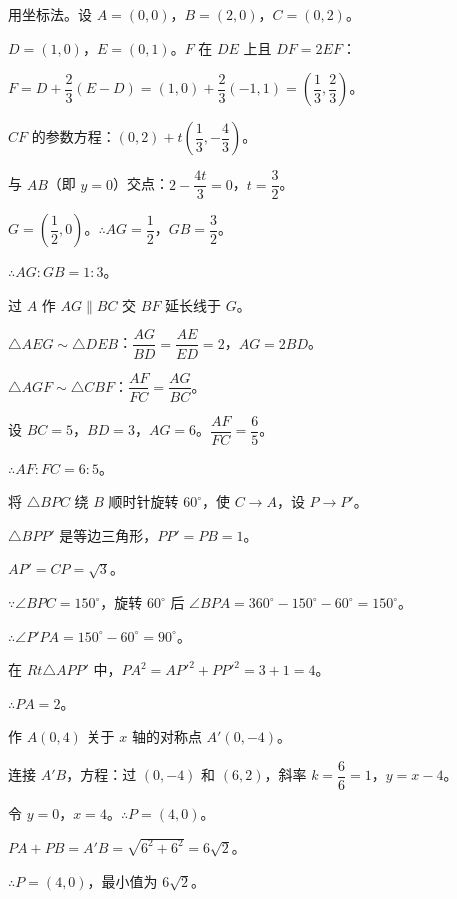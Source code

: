 \documentclass[12pt, a4paper]{ctexart}
\begin{document}
\begin{knowledgebox}[第 4 题 参考答案]
用坐标法。设 \(A = (0, 0)\)，\(B = (2, 0)\)，\(C = (0, 2)\)。

\(D = (1, 0)\)，\(E = (0, 1)\)。\(F\) 在 \(DE\) 上且 \(DF = 2EF\)：

\(F = D + \dfrac{2}{3}(E - D) = (1, 0) + \dfrac{2}{3}(-1, 1) = \left(\dfrac{1}{3}, \dfrac{2}{3}\right)\)。

\(CF\) 的参数方程：\((0, 2) + t\left(\dfrac{1}{3}, -\dfrac{4}{3}\right)\)。

与 \(AB\)（即 \(y = 0\)）交点：\(2 - \dfrac{4t}{3} = 0\)，\(t = \dfrac{3}{2}\)。

\(G = \left(\dfrac{1}{2}, 0\right)\)。\(\therefore AG = \dfrac{1}{2}\)，\(GB = \dfrac{3}{2}\)。

\(\therefore AG:GB = 1:3\)。
\end{knowledgebox}

\begin{knowledgebox}[第 5 题 参考答案]
过 \(A\) 作 \(AG \parallel BC\) 交 \(BF\) 延长线于 \(G\)。

\(\triangle AEG \sim \triangle DEB\)：\(\dfrac{AG}{BD} = \dfrac{AE}{ED} = 2\)，\(AG = 2BD\)。

\(\triangle AGF \sim \triangle CBF\)：\(\dfrac{AF}{FC} = \dfrac{AG}{BC}\)。

设 \(BC = 5\)，\(BD = 3\)，\(AG = 6\)。\(\dfrac{AF}{FC} = \dfrac{6}{5}\)。

\(\therefore AF:FC = 6:5\)。
\end{knowledgebox}

\begin{knowledgebox}[第 6 题 参考答案]
将 \(\triangle BPC\) 绕 \(B\) 顺时针旋转 \(60^\circ\)，使 \(C \to A\)，设 \(P \to P'\)。

\(\triangle BPP'\) 是等边三角形，\(PP' = PB = 1\)。

\(AP' = CP = \sqrt{3}\)。

\(\because \angle BPC = 150^\circ\)，旋转 \(60^\circ\) 后 \(\angle BPA = 360^\circ - 150^\circ - 60^\circ = 150^\circ\)。

\(\therefore \angle P'PA = 150^\circ - 60^\circ = 90^\circ\)。

在 \(Rt\triangle APP'\) 中，\(PA^2 = AP'^2 + PP'^2 = 3 + 1 = 4\)。

\(\therefore PA = 2\)。
\end{knowledgebox}

\begin{knowledgebox}[第 7 题 参考答案]
作 \(A(0, 4)\) 关于 \(x\) 轴的对称点 \(A'(0, -4)\)。

连接 \(A'B\)，方程：过 \((0, -4)\) 和 \((6, 2)\)，斜率 \(k = \dfrac{6}{6} = 1\)，\(y = x - 4\)。

令 \(y = 0\)，\(x = 4\)。\(\therefore P = (4, 0)\)。

\(PA + PB = A'B = \sqrt{6^2 + 6^2} = 6\sqrt{2}\)。

\(\therefore P = (4, 0)\)，最小值为 \(6\sqrt{2}\)。
\end{knowledgebox}
\end{document}
